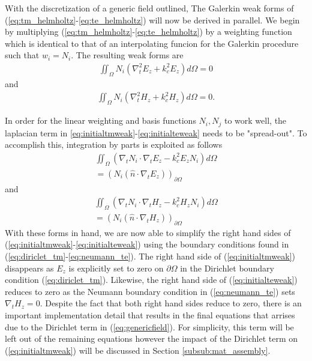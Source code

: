 With the discretization of a generic field outlined, The Galerkin weak forms of (\ref{eq:tm_helmholtz}-\ref{eq:te_helmholtz}) will now be derived in parallel. We begin by multiplying (\ref{eq:tm_helmholtz}-\ref{eq:te_helmholtz}) by a weighting function which is identical to that of an interpolating funcion for the Galerkin procedure such that $w_i=N_i$. The resulting weak forms are
\begin{align}
	\iint_\Omega N_i \left(\nabla_t^2 E_z+k_c^2E_z\right)d\Omega = 0
	\label{eq:initialtmweak}
\end{align}
and
\begin{align}
	\iint_\Omega N_i \left(\nabla_t^2 H_z+k_c^2H_z\right)d\Omega = 0.
	\label{eq:initialteweak}
\end{align}

In order for the linear weighting and basis functions $N_i, N_j$ to work well, the laplacian term in \ref{eq:initialtmweak}-\ref{eq:initialteweak} needs to be "spread-out". To accomplish this, integration by parts is exploited as follows
\begin{multline}
	\iint_\Omega\left(\nabla_tN_i\cdot\nabla_tE_z-k_c^2E_zN_i\right)d\Omega \\= \left(N_i(\hat{n}\cdot\nabla_tE_z)\right)_{\partial\Omega}
	\label{eq:initialtmweak}
\end{multline}
and
\begin{multline}
	\iint_\Omega\left(\nabla_tN_i\cdot\nabla_tH_z-k_c^2H_zN_i\right)d\Omega \\= \left(N_i(\hat{n}\cdot\nabla_tH_z)\right)_{\partial\Omega}
	\label{eq:initialteweak}
\end{multline}
With these forms in hand, we are now able to simplify the right hand sides of (\ref{eq:initialtmweak}-\ref{eq:initialteweak}) using the boundary conditions found in (\ref{eq:diriclet_tm}-\ref{eq:neumann_te}). The right hand side of (\ref{eq:initialtmweak}) disappears as $E_z$ is explicitly set to zero on $\partial\Omega$ in the Dirichlet boundary condition (\ref{eq:diriclet_tm}). Likewise, the right hand side of (\ref{eq:initialteweak}) reduces to zero as the Neumann boundary condition in (\ref{eq:neumann_te}) sets $\nabla_tH_z=0$. Despite the fact that both right hand sides reduce to zero, there is an important implementation detail that results in the final equations that arrises due to the Dirichlet term in (\ref{eq:genericfield}). For simplicity, this term will be left out of the remaining equations however the impact of the Dirichlet term on (\ref{eq:initialtmweak}) will be discussed in Section \ref{subsub:mat_assembly}.

